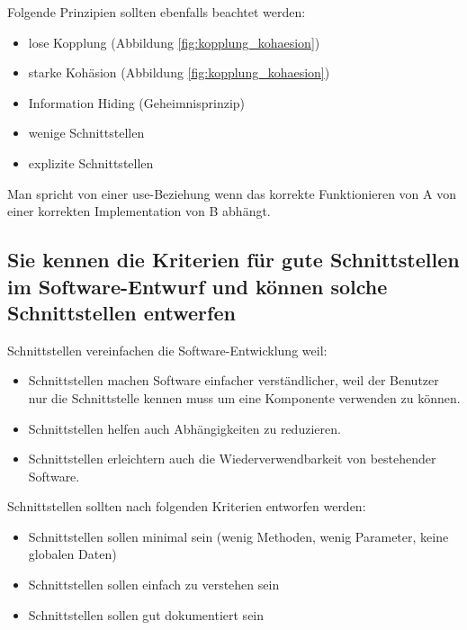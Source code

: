 Folgende Prinzipien sollten ebenfalls beachtet werden:

\begin{itemize}
	\item lose Kopplung (Abbildung \ref{fig:kopplung_kohaesion})
	\item starke Kohäsion (Abbildung \ref{fig:kopplung_kohaesion})
	\item Information Hiding (Geheimnisprinzip)
	\item wenige Schnittstellen
	\item explizite Schnittstellen
\end{itemize}


Man spricht von einer use-Beziehung wenn das korrekte Funktionieren von A von einer korrekten Implementation von B abhängt.

\newpage

\subsection{Sie kennen die Kriterien für gute Schnittstellen im Software-Entwurf und können solche Schnittstellen entwerfen}

Schnittstellen vereinfachen die Software-Entwicklung weil:

\begin{itemize}
	\item Schnittstellen machen Software einfacher verständlicher, weil der Benutzer nur die Schnittstelle kennen muss um eine Komponente verwenden zu können.
	\item Schnittstellen helfen auch Abhängigkeiten zu reduzieren.
	\item Schnittstellen erleichtern auch die Wiederverwendbarkeit von bestehender Software.
\end{itemize}

Schnittstellen sollten nach folgenden Kriterien entworfen werden:

\begin{itemize}
	\item Schnittstellen sollen minimal sein (wenig Methoden, wenig Parameter, keine globalen Daten)
	\item Schnittstellen sollen einfach zu verstehen sein
	\item Schnittstellen sollen gut dokumentiert sein
\end{itemize}

